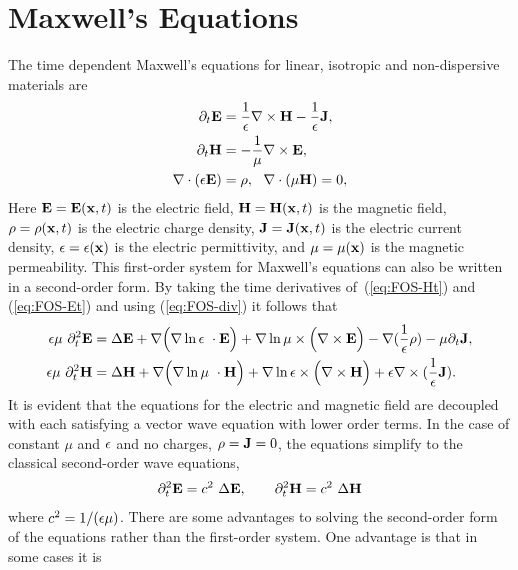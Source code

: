 \documentclass{article}
\begin{document}
\clearpage
\section{Maxwell's Equations} \label{sec:equations}


The time dependent Maxwell's equations for linear, isotropic and non-dispersive materials are
\begin{align}
  \partial_t \mathbf{ E} &=  {1\over \epsilon} \nabla\times\mathbf{ H} - {1\over \epsilon}\mathbf{ J} , \label{eq:FOS-Et}  \\
  \partial_t \mathbf{ H} &= - {1\over \mu} \nabla\times\mathbf{ E} ,  \label{eq:FOS-Ht} \\
  \nabla\cdot(\epsilon\mathbf{ E}) &=\rho , ~~ \nabla\cdot(\mu\mathbf{ H}) = 0 , \label{eq:FOS-div}
\end{align}
Here $\mathbf{ E}=\mathbf{ E}(\mathbf{ x},t)$ is the electric field, 
$\mathbf{ H}=\mathbf{ H}(\mathbf{ x},t)$ is the magnetic field, $\rho=\rho(\mathbf{ x},t)$ is the electric charge density,
$\mathbf{ J}=\mathbf{ J}(\mathbf{ x},t)$ is the electric current density,
$\epsilon=\epsilon(\mathbf{ x})$ is the electric permittivity, and $\mu=\mu(\mathbf{ x})$ is the magnetic permeability.
This first-order system for Maxwell's equations can also be written in a
second-order form. By taking the time derivatives of~(\ref{eq:FOS-Ht}) and
(\ref{eq:FOS-Et}) and using (\ref{eq:FOS-div}) it follows that 
\begin{align}
 \epsilon\mu~\partial_t^2 \mathbf{ E} &= \Delta \mathbf{ E} + \nabla\Big( \nabla \ln\epsilon~\cdot\mathbf{ E} \Big)
        +\nabla\ln\mu\times\Big(\nabla\times\mathbf{ E}\Big) 
            -\nabla(\frac{1}{\epsilon}\rho)- \mu \partial_t\mathbf{ J} , \label{eq:waveEGen} \\
 \epsilon\mu~\partial_t^2 \mathbf{ H} &= \Delta \mathbf{ H} + \nabla\Big( \nabla \ln\mu~\cdot\mathbf{ H} \Big)
                               +\nabla\ln\epsilon\times\Big(\nabla\times\mathbf{ H}\Big) 
                     + \epsilon\nabla\times(\frac{1}{\epsilon}\mathbf{ J} ) \label{eq:waveHGen}.
\end{align}
It is evident that the equations for the electric and magnetic field are decoupled with each 
satisfying a vector wave equation with lower order terms.
In the case of constant $\mu$ and $\epsilon$ and no charges, $\rho=\mathbf{ J}=0$, 
the equations simplify to the classical second-order wave equations,
\begin{align}
  \partial_t^2 \mathbf{ E} = c^2~ \Delta \mathbf{ E} , \qquad
  \partial_t^2 \mathbf{ H} = c^2~ \Delta \mathbf{ H} \label{eq:waveE}
\end{align}
where $c^2=1/(\epsilon\mu)$.
There are some advantages to solving the second-order form of the equations
rather than the first-order system. One advantage is that in some cases it is
\end{document}
